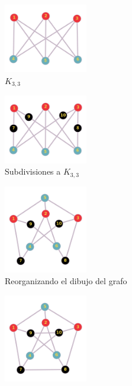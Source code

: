 \documentclass[a4paper,1pt]{report}
\begin{document}
\begin{figure}[H]
    \centering
    \begin{subfigure}[b]{0.45\textwidth}
    \centering
    \includegraphics[width=0.4\textwidth]{figures5/k33Petersen1.png}
    \caption{$K_{3,3}$}
    \end{subfigure}
    \begin{subfigure}[b]{0.45\textwidth}
        \centering
    \includegraphics[width=0.4\textwidth]{figures5/k33Petersen2.png}
    \caption{Subdivisiones a $K_{3,3}$}
    \end{subfigure}
    \begin{subfigure}[b]{0.45\textwidth}
        \centering
    \includegraphics[width=0.4\textwidth]{figures5/k33Petersen3.png}
    \caption{Reorganizando el dibujo del grafo}
    \end{subfigure}
    \begin{subfigure}[b]{0.45\textwidth}
        \centering
    \includegraphics[width=0.4\textwidth]{figures5/k33Petersen4.png}

\end{subfigure}
\end{figure}
\end{document}
